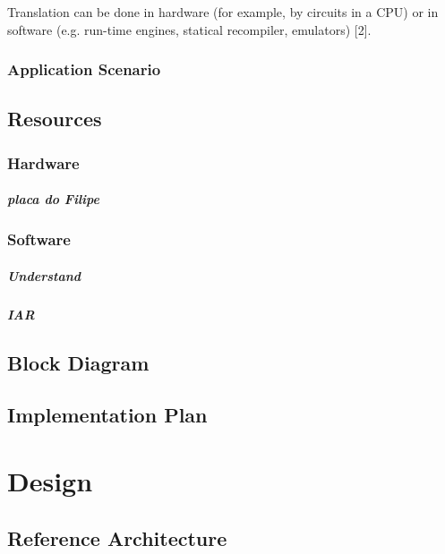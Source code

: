 \documentclass{report}
\begin{document}
		Translation can be done in hardware (for example, by circuits in a CPU) or in software (e.g. run-time engines, statical recompiler, emulators) [2].
		

		\subsection{Application Scenario}

	\section{Resources}

		\subsection{Hardware}

			\paragraph{placa do Filipe}

		\subsection{Software}

			\paragraph{Understand}

			\paragraph{IAR}

	\section{Block Diagram}

	\section{Implementation Plan}

\chapter{Design}

	\section{Reference Architecture}
\end{document}

